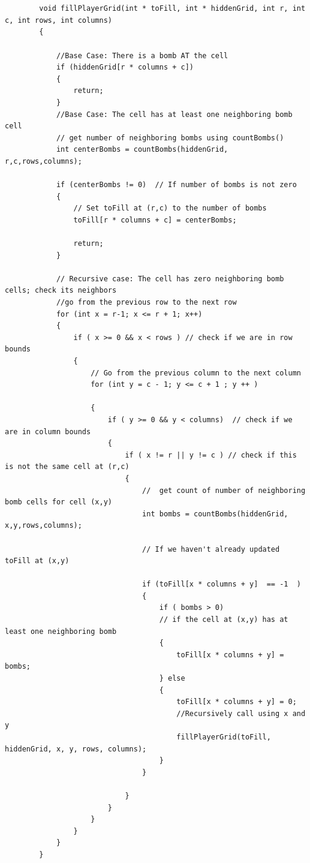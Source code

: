 \documentclass{article}
\begin{document}
\begin{enumerate}[label=(\alph*)]
\begin{lstlisting}[style=CStyle]
        
        
        void fillPlayerGrid(int * toFill, int * hiddenGrid, int r, int c, int rows, int columns) 
        {

            //Base Case: There is a bomb AT the cell
            if (hiddenGrid[r * columns + c])
            {
                return;
            }
            //Base Case: The cell has at least one neighboring bomb cell
            // get number of neighboring bombs using countBombs()
            int centerBombs = countBombs(hiddenGrid, r,c,rows,columns); 
            
            if (centerBombs != 0)  // If number of bombs is not zero
            {
                // Set toFill at (r,c) to the number of bombs
                toFill[r * columns + c] = centerBombs; 
                
                return;
            }

            // Recursive case: The cell has zero neighboring bomb cells; check its neighbors
            //go from the previous row to the next row 
            for (int x = r-1; x <= r + 1; x++) 
            {
                if ( x >= 0 && x < rows ) // check if we are in row bounds
                {
                    // Go from the previous column to the next column
                    for (int y = c - 1; y <= c + 1 ; y ++ ) 
                    
                    {
                        if ( y >= 0 && y < columns)  // check if we are in column bounds
                        {
                            if ( x != r || y != c ) // check if this is not the same cell at (r,c)
                            {   
                                //  get count of number of neighboring bomb cells for cell (x,y)
                                int bombs = countBombs(hiddenGrid, x,y,rows,columns); 
                                
                                // If we haven't already updated toFill at (x,y)
                                
                                if (toFill[x * columns + y]  == -1  )
                                {
                                    if ( bombs > 0) 
                                    // if the cell at (x,y) has at least one neighboring bomb
                                    {
                                        toFill[x * columns + y] = bombs;
                                    } else
                                    {
                                        toFill[x * columns + y] = 0;
                                        //Recursively call using x and y
                                        fillPlayerGrid(toFill, hiddenGrid, x, y, rows, columns);
                                    }
                                }
                                
                            }
                        }
                    }
                }
            }
        }
    \end{lstlisting}

    
\end{enumerate}
\end{document}
